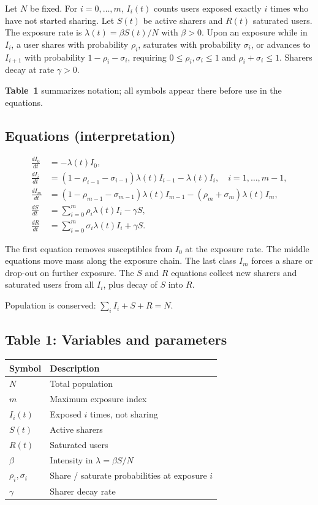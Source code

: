 \documentclass[11pt]{article}
\begin{document}
Let $N$ be fixed. For $i=0,\ldots,m$, $I_i(t)$ counts users exposed exactly $i$ times who have not started sharing. Let $S(t)$ be active sharers and $R(t)$ saturated users. The exposure rate is $\lambda(t)=\beta S(t)/N$ with $\beta>0$. Upon an exposure while in $I_i$, a user shares with probability $\rho_i$, saturates with probability $\sigma_i$, or advances to $I_{i+1}$ with probability $1-\rho_i-\sigma_i$, requiring $0\le\rho_i,\sigma_i\le 1$ and $\rho_i+\sigma_i\le 1$. Sharers decay at rate $\gamma>0$.

\textbf{Table~1} summarizes notation; all symbols appear there before use in the equations.

\subsection{Equations (interpretation)}

\begin{align}
\frac{dI_0}{dt} &= -\lambda(t) I_0, \\
\frac{dI_i}{dt} &= (1-\rho_{i-1}-\sigma_{i-1})\lambda(t)I_{i-1}-\lambda(t)I_i, \quad i=1,\ldots,m-1, \\
\frac{dI_m}{dt} &= (1-\rho_{m-1}-\sigma_{m-1})\lambda(t)I_{m-1}-(\rho_m+\sigma_m)\lambda(t)I_m, \\
\frac{dS}{dt} &= \sum_{i=0}^{m}\rho_i\lambda(t)I_i-\gamma S, \\
\frac{dR}{dt} &= \sum_{i=0}^{m}\sigma_i\lambda(t)I_i+\gamma S.
\end{align}

The first equation removes susceptibles from $I_0$ at the exposure rate. The middle equations move mass along the exposure chain. The last class $I_m$ forces a share or drop-out on further exposure. The $S$ and $R$ equations collect new sharers and saturated users from all $I_i$, plus decay of $S$ into $R$.

Population is conserved: $\sum_i I_i+S+R=N$.

\subsection{Table 1: Variables and parameters}

\begin{center}
\begin{tabular}{ll}
\toprule
Symbol & Description \\
\midrule
$N$ & Total population \\
$m$ & Maximum exposure index \\
$I_i(t)$ & Exposed $i$ times, not sharing \\
$S(t)$ & Active sharers \\
$R(t)$ & Saturated users \\
$\beta$ & Intensity in $\lambda=\beta S/N$ \\
$\rho_i,\sigma_i$ & Share / saturate probabilities at exposure $i$ \\
$\gamma$ & Sharer decay rate \\
\bottomrule
\end{tabular}
\end{center}
\end{document}
